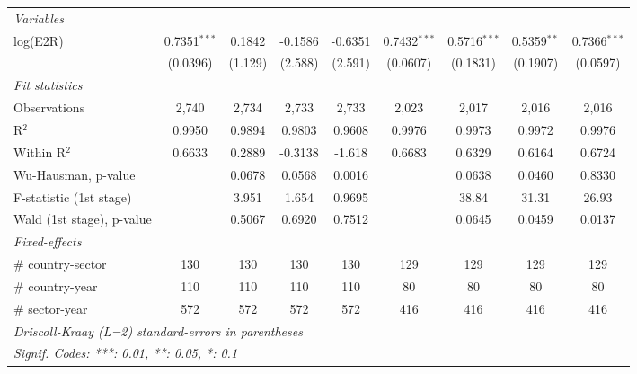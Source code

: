 \documentclass[a4paper]{article}
\begin{document}
\begin{table}[h!]
{\begin{tabular}{lcccccccc}
      \midrule
       \emph{Variables}\\
      log(E2R)                & 0.7351$^{***}$     & 0.1842                & -0.1586                & -0.6351               & 0.7432$^{***}$     & 0.5716$^{***}$        & 0.5359$^{**}$          & 0.7366$^{***}$\\   
                              & (0.0396)           & (1.129)               & (2.588)                & (2.591)               & (0.0607)           & (0.1831)              & (0.1907)               & (0.0597)\\ 
      \emph{Fit statistics}\\
      Observations            & 2,740              & 2,734                 & 2,733                  & 2,733                 & 2,023              & 2,017                 & 2,016                  & 2,016\\  
      R$^2$                   & 0.9950             & 0.9894                & 0.9803                 & 0.9608                & 0.9976             & 0.9973                & 0.9972                 & 0.9976\\  
      Within R$^2$            & 0.6633             & 0.2889                & -0.3138                & -1.618                & 0.6683             & 0.6329                & 0.6164                 & 0.6724\\  
      Wu-Hausman, p-value     &                    & 0.0678                & 0.0568                 & 0.0016                &                    & 0.0638                & 0.0460                 & 0.8330\\  
      F-statistic (1st stage)       &                    & 3.951                 & 1.654                  & 0.9695                &                    & 38.84                 & 31.31                  & 26.93\\  
      Wald (1st stage), p-value &                    & 0.5067                & 0.6920                 & 0.7512                &                    & 0.0645                & 0.0459                 & 0.0137\\ 
      \midrule
      \emph{Fixed-effects}\\
      \# country-sector       & 130            & 130                   & 130                   & 130                   & 129      & 129                   & 129                   & 129\\  
      \# country-year         & 110            & 110                   & 110                   & 110                   & 80       & 80                    & 80                    & 80\\  
      \# sector-year          & 572            & 572                   & 572                   & 572                   & 416      & 416                   & 416                   & 416\\  
      \midrule \midrule
      \multicolumn{9}{l}{\emph{Driscoll-Kraay (L=2) standard-errors in parentheses}}\\
      \multicolumn{9}{l}{\emph{Signif. Codes: ***: 0.01, **: 0.05, *: 0.1}}\\
   \end{tabular}
   }
\end{table}
\FloatBarrier
\end{document}
